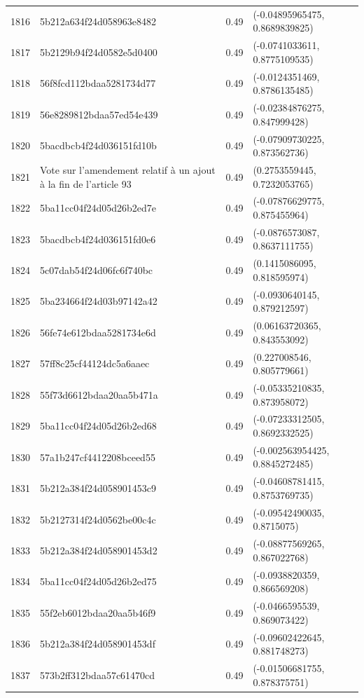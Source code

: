 \begin{table}[ht]
\begin{tabular}{rlrl}
  1816 & 5b212a634f24d058963e8482 & 0.49 & (-0.04895965475, 0.8689839825) \\ 
  1817 & 5b2129b94f24d0582e5d0400 & 0.49 & (-0.0741033611, 0.8775109535) \\ 
  1818 & 56f8fcd112bdaa5281734d77 & 0.49 & (-0.0124351469, 0.8786135485) \\ 
  1819 & 56e8289812bdaa57ed54e439 & 0.49 & (-0.02384876275, 0.847999428) \\ 
  1820 & 5bacdbcb4f24d036151fd10b & 0.49 & (-0.07909730225, 0.873562736) \\ 
  1821 & Vote sur l'amendement relatif à un ajout à la fin de l'article 93 & 0.49 & (0.2753559445, 0.7232053765) \\ 
  1822 & 5ba11cc04f24d05d26b2ed7e & 0.49 & (-0.07876629775, 0.875455964) \\ 
  1823 & 5bacdbcb4f24d036151fd0e6 & 0.49 & (-0.0876573087, 0.8637111755) \\ 
  1824 & 5c07dab54f24d06fc6f740bc & 0.49 & (0.1415086095, 0.818595974) \\ 
  1825 & 5ba234664f24d03b97142a42 & 0.49 & (-0.0930640145, 0.879212597) \\ 
  1826 & 56fe74e612bdaa5281734e6d & 0.49 & (0.06163720365, 0.843553092) \\ 
  1827 & 57ff8c25cf44124dc5a6aaec & 0.49 & (0.227008546, 0.805779661) \\ 
  1828 & 55f73d6612bdaa20aa5b471a & 0.49 & (-0.05335210835, 0.873958072) \\ 
  1829 & 5ba11cc04f24d05d26b2ed68 & 0.49 & (-0.07233312505, 0.8692332525) \\ 
  1830 & 57a1b247cf4412208bceed55 & 0.49 & (-0.002563954425, 0.8845272485) \\ 
  1831 & 5b212a384f24d058901453c9 & 0.49 & (-0.04608781415, 0.8753769735) \\ 
  1832 & 5b2127314f24d0562be00c4c & 0.49 & (-0.09542490035, 0.8715075) \\ 
  1833 & 5b212a384f24d058901453d2 & 0.49 & (-0.08877569265, 0.867022768) \\ 
  1834 & 5ba11cc04f24d05d26b2ed75 & 0.49 & (-0.0938820359, 0.866569208) \\ 
  1835 & 55f2eb6012bdaa20aa5b46f9 & 0.49 & (-0.0466595539, 0.869073422) \\ 
  1836 & 5b212a384f24d058901453df & 0.49 & (-0.09602422645, 0.881748273) \\ 
  1837 & 573b2ff312bdaa57c61470cd & 0.49 & (-0.01506681755, 0.878375751) \\ 

\end{tabular}
\end{table}

